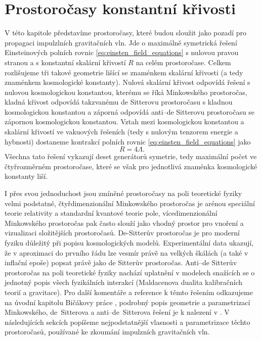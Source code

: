 \chapter{Prostoročasy konstantní křivosti}
\label{chap:kap01}
V této kapitole představíme prostoročasy, které budou sloužit jako pozadí pro propagaci impulzlních gravitačních vln. Jde o maximálně
symetrická řešení Einsteinových polních rovnic \eqref{eq:einsten_field_equations} s nulovou pravou stranou a s konstantní skalární křivostí $R$ na celém prostoročase.
Celkem rozlišujeme tři takové geometrie lišící se znaménkem skalární křivosti (a tedy znaménkem kosmologické konstanty). Nulová skalární křivost odpovídá řešení s nulovou
kosmologickou konstantou, kterému se říká Minkowského prostoročas, kladná křivost odpovídá takzvanému de Sitterovu prostoročasu s kladnou kosmologickou
konstantou a záporná odpovídá anti--de Sitterovu prostoročasu se zápornou kosmologickou konstantou. Vztah mezi kosmologickou konstantou a skalární
křivostí ve vakuových řešeních (tedy s nulovým tenzorem energie a hybnosti) dostaneme kontrakcí polních rovnic \eqref{eq:einsten_field_equations} jako
\begin{equation}
     R = 4 \Lambda.
\end{equation}
Všechna tato řešení vykazují deset generátorů symetrie, tedy maximální počet ve čtyřrozměrném prostoročase, které se však pro jednotlivá znaménka kosmologické konstanty liší.

I přes svou jednoduchost jsou zmíněné prostoročasy na poli teoretické fyziky velmi podstatné, čtyřdimenzionální Minkowského prostoročas je arénou speciální
teorie relativity a standardní kvantové teorie pole, vícedimenzionální Minkowského prostoročas pak často slouží jako vhodný prostor pro vnoření a vizualizaci složitějších prostoročasů.
De-Sitterův prostoročas je pro moderní fyziku důležitý při popisu kosmologických modelů. Experimentální data
ukazují, že v aproximaci do prvního řádu lze vesmír právě na velkých škálách (a také v inflační epoše) popsat právě jako de Sitterův prostoročas.
Anti--de Sitterův prostoročas na poli teoretické fyziky nachází uplatnění v modelech snažících se o jednotný popis všech fyzikálních interakcí (Maldacenova dualita kalibračních teorií a gravitace).
Pro další komentáře a reference k těmto řešením odkazujeme na úvodní kapitolu Bičákovy práce \cite{Bicak:2000ea}, podrobný popis geometrie a parametrizací Minkowského, de~Sitterova a anti--de~Sitterova
řešení je k nalezení v \cite{griffiths_podolsky_2009}. V následujících sekcích popíšeme nejpodstatnější vlasnosti
a parametrizace těchto prostoročasů, používané ke zkoumání impulzních gravitačních vln.


